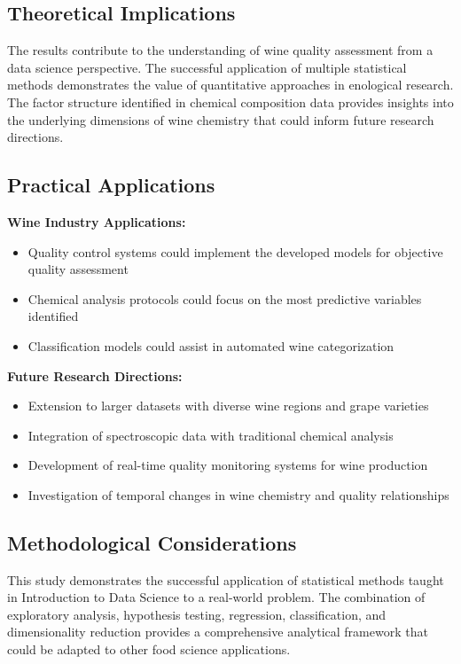 \subsection{Theoretical Implications}

The results contribute to the understanding of wine quality assessment from a data science perspective. The successful application of multiple statistical methods demonstrates the value of quantitative approaches in enological research. The factor structure identified in chemical composition data provides insights into the underlying dimensions of wine chemistry that could inform future research directions.

\subsection{Practical Applications}

\textbf{Wine Industry Applications:}
\begin{itemize}
    \item Quality control systems could implement the developed models for objective quality assessment
    \item Chemical analysis protocols could focus on the most predictive variables identified
    \item Classification models could assist in automated wine categorization
\end{itemize}

\textbf{Future Research Directions:}
\begin{itemize}
    \item Extension to larger datasets with diverse wine regions and grape varieties
    \item Integration of spectroscopic data with traditional chemical analysis
    \item Development of real-time quality monitoring systems for wine production
    \item Investigation of temporal changes in wine chemistry and quality relationships
\end{itemize}

\subsection{Methodological Considerations}

This study demonstrates the successful application of statistical methods taught in Introduction to Data Science to a real-world problem. The combination of exploratory analysis, hypothesis testing, regression, classification, and dimensionality reduction provides a comprehensive analytical framework that could be adapted to other food science applications.

